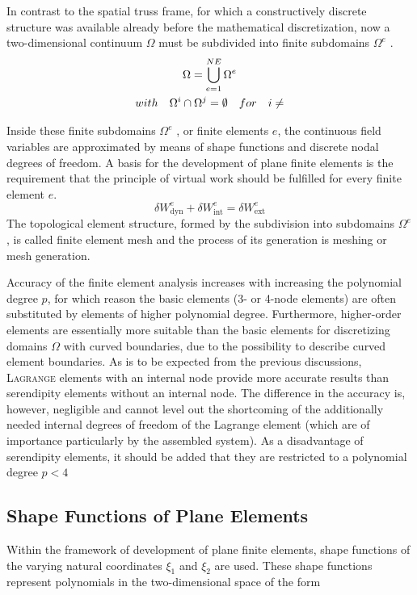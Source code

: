 In contrast to the spatial truss frame, for which a constructively discrete structure was available
already before the mathematical discretization, now a two-dimensional continuum $\Omega$ must be
subdivided into finite subdomains $\Omega^e$ .
\begin{equation}
\label{eqn:3.28}
\begin{gathered}
    \Omega  = \bigcup\limits_{e = 1}^{NE} {{\Omega ^e}}\\
    with \quad {\Omega ^i} \cap {\Omega ^j} = \emptyset {\rm{ }} \quad for \quad i \ne 
\end{gathered}
\end{equation}

Inside these finite subdomains $\Omega^e$ , or finite elements $e$, the continuous field variables are approximated by means of shape functions and discrete nodal degrees of freedom. A basis for the
development of plane finite elements is the requirement that the principle of virtual work should
be fulfilled for every finite element $e$. 
\begin{equation}
\label{eqn:3.29}
 \delta W_{\mathrm{dyn}}^{e}+\delta W_{\mathrm{int}}^{e}=\delta W_{\mathrm{ext}}^{e} 
\end{equation}
The topological element structure, formed by the subdivision into subdomains $\Omega^e$ , is called finite element mesh and the process of its generation is meshing or mesh generation.

Accuracy of the finite element analysis increases with increasing the polynomial degree $p$, for which
reason the basic elements (3- or 4-node elements) are often substituted by elements of higher
polynomial degree. Furthermore, higher-order elements are essentially more suitable than the basic elements for discretizing domains $\Omega$ with curved boundaries, due to the possibility to
describe curved element boundaries. As is to be expected from the previous discussions, \textsc{Lagrange} elements with an internal node provide more accurate results than serendipity elements
without an internal node. The difference in the accuracy is, however, negligible and cannot level
out the shortcoming of the additionally needed internal degrees of freedom of the Lagrange
element (which are of importance particularly by the assembled system). As a disadvantage of
serendipity elements, it should be added that they are restricted to a polynomial degree $p < 4$

\subsection{Shape Functions of Plane Elements }
Within the framework of development of plane finite elements, shape functions of the varying
natural coordinates $\xi_1$ and $ \xi_2$ are used. These shape functions represent polynomials in the
two-dimensional space of the form


